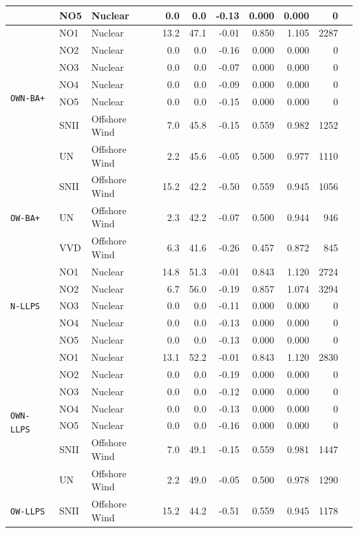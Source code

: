 \begin{table}[htbp]
\begin{tabular}{lllrrrrrrr}
 & NO5 & Nuclear & 0.0 & 0.0 & -0.13 & 0.000 & 0.000 & 0 \\
\midrule
\multirow{7}{*}{\texttt{OWN-BA+}} & NO1 & Nuclear & 13.2 & 47.1 & -0.01 & 0.850 & 1.105 & 2287 \\
 & NO2 & Nuclear & 0.0 & 0.0 & -0.16 & 0.000 & 0.000 & 0 \\
 & NO3 & Nuclear & 0.0 & 0.0 & -0.07 & 0.000 & 0.000 & 0 \\
 & NO4 & Nuclear & 0.0 & 0.0 & -0.09 & 0.000 & 0.000 & 0 \\
 & NO5 & Nuclear & 0.0 & 0.0 & -0.15 & 0.000 & 0.000 & 0 \\
 & SNII & Offshore Wind & 7.0 & 45.8 & -0.15 & 0.559 & 0.982 & 1252 \\
 & UN & Offshore Wind & 2.2 & 45.6 & -0.05 & 0.500 & 0.977 & 1110 \\
\midrule
\multirow{3}{*}{\texttt{OW-BA+}} & SNII & Offshore Wind & 15.2 & 42.2 & -0.50 & 0.559 & 0.945 & 1056 \\
 & UN & Offshore Wind & 2.3 & 42.2 & -0.07 & 0.500 & 0.944 & 946 \\
 & VVD & Offshore Wind & 6.3 & 41.6 & -0.26 & 0.457 & 0.872 & 845 \\
\midrule
\multirow{5}{*}{\texttt{N-LLPS}} & NO1 & Nuclear & 14.8 & 51.3 & -0.01 & 0.843 & 1.120 & 2724 \\
 & NO2 & Nuclear & 6.7 & 56.0 & -0.19 & 0.857 & 1.074 & 3294 \\
 & NO3 & Nuclear & 0.0 & 0.0 & -0.11 & 0.000 & 0.000 & 0 \\
 & NO4 & Nuclear & 0.0 & 0.0 & -0.13 & 0.000 & 0.000 & 0 \\
 & NO5 & Nuclear & 0.0 & 0.0 & -0.13 & 0.000 & 0.000 & 0 \\
\midrule
\multirow{7}{*}{\texttt{OWN-LLPS}} & NO1 & Nuclear & 13.1 & 52.2 & -0.01 & 0.843 & 1.120 & 2830 \\
 & NO2 & Nuclear & 0.0 & 0.0 & -0.19 & 0.000 & 0.000 & 0 \\
 & NO3 & Nuclear & 0.0 & 0.0 & -0.12 & 0.000 & 0.000 & 0 \\
 & NO4 & Nuclear & 0.0 & 0.0 & -0.13 & 0.000 & 0.000 & 0 \\
 & NO5 & Nuclear & 0.0 & 0.0 & -0.16 & 0.000 & 0.000 & 0 \\
 & SNII & Offshore Wind & 7.0 & 49.1 & -0.15 & 0.559 & 0.981 & 1447 \\
 & UN & Offshore Wind & 2.2 & 49.0 & -0.05 & 0.500 & 0.978 & 1290 \\
\midrule
\multirow{3}{*}{\texttt{OW-LLPS}} & SNII & Offshore Wind & 15.2 & 44.2 & -0.51 & 0.559 & 0.945 & 1178 \\

\end{tabular}
\end{table}
